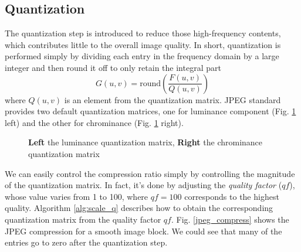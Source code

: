 \documentclass[11pt]{article}
\begin{document}
\subsection{Quantization}
The quantization step is introduced to reduce those high-frequency contents, which contributes little to the overall image quality. In short, quantization is performed simply by dividing each entry in the frequency domain by a large integer and then round it off to only retain the integral part
\begin{equation}
G(u, v) = \text{round}\left(\frac{F(u, v)}{Q(u, v)}\right)
\end{equation}
where $Q(u, v)$ is an element from the quantization matrix. JPEG standard provides two default quantization matrices, one for luminance component (Fig. \ref{Q} left) and the other for chrominance (Fig. \ref{Q} right).
\begin{figure}
\centering
{} 
\caption{\textbf{Left} the luminance quantization matrix, \textbf{Right} the chrominance quantization matrix}
\label{Q}
\end{figure}
We can easily control the compression ratio simply by controlling the magnitude of the quantization matrix. In fact, it's done by adjusting the \textit{quality factor} ($qf$), whose value varies from 1 to 100, where $qf =100$ corresponds to the highest quality. Algorithm \ref{alg:scale_q} describes how to obtain the corresponding quantization matrix from the quality factor $qf$. Fig. \ref{jpeg_compress} shows the JPEG compression for a smooth image block. We could see that many of the entries go to zero after the quantization step.
\end{document}
